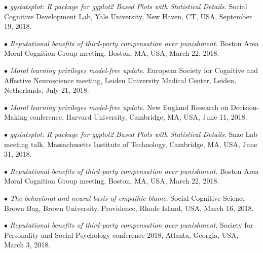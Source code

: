 \documentclass[10pt]{article}
\begin{document}
	$\bullet$ \textit{ggstatsplot: R package for ggplot2 Based Plots with Statistical Details}. Social Cognitive Development Lab, \hspace*{0.1in}Yale University, New Haven, CT, USA, September 19, 2018.\\
	\miniskip

	$\bullet$ \textit{Reputational benefits of third-party compensation over punishment}. Boston Area Moral Cognition Group \hspace*{0.1in}meeting, Boston, MA, USA, March 22, 2018.\\
	\miniskip

	$\bullet$ \textit{Moral learning privileges model-free update}. European Society for Cognitive and Affective Neuroscience \hspace*{0.1in}meeting, Leiden University Medical Center, Leiden, Netherlands, July 21, 2018.\\
	\miniskip
	
	$\bullet$ \textit{Moral learning privileges model-free update}. New England Research on Decision-Making conference, Harvard \hspace*{0.1in}University, Cambridge, MA, USA, June 11, 2018.\\
	\miniskip

	$\bullet$ \textit{ggstatsplot: R package for ggplot2 Based Plots with Statistical Details}. Saxe Lab meeting talk, Massachusetts \hspace*{0.1in}Institute of Technology, Cambridge, MA, USA, June 31, 2018.\\
	\miniskip
		
	$\bullet$ \textit{Reputational benefits of third-party compensation over punishment}. Boston Area Moral Cognition Group \hspace*{0.1in}meeting, Boston, MA, USA, March 22, 2018.\\
	\miniskip

	$\bullet$ \textit{The behavioral and neural basis of empathic blame}. Social Cognitive Science Brown Bag, Brown University, \hspace*{0.1in}Providence, Rhode Island, USA, March 16, 2018.\\
	\miniskip	
	
	$\bullet$ \textit{Reputational benefits of third-party compensation over punishment}. Society for Personality and Social \hspace*{0.1in}Psychology conference 2018, Atlanta, Georgia, USA, March 3, 2018.\\
	\miniskip
	
\end{document}
